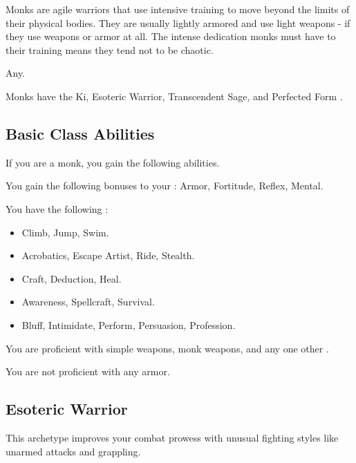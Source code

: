     Monks are agile warriors that use intensive training to move beyond the limits of their physical bodies.
    They are usually lightly armored and use light weapons - if they use weapons or armor at all.
    The intense dedication monks must have to their training means they tend not to be chaotic.

     Any.

     Monks have the Ki, Esoteric Warrior, Transcendent Sage, and Perfected Form .

    \subsection{Basic Class Abilities}
        If you are a monk, you gain the following abilities.

        You gain the following bonuses to your :  Armor,  Fortitude,  Reflex,  Mental.

        You have the following :
        \begin{itemize}
            \item {} Climb, Jump, Swim.
            \item {} Acrobatics, Escape Artist, Ride, Stealth.
            \item {} Craft, Deduction, Heal.
            \item {} Awareness, Spellcraft, Survival.
            \item {} Bluff, Intimidate, Perform, Persuasion, Profession.
        \end{itemize}

        You are proficient with simple weapons, monk weapons, and any one other .

        You are not proficient with any armor.

    \subsection{Esoteric Warrior}\label{Esoteric Warrior}
        This archetype improves your combat prowess with unusual fighting styles like unarmed attacks and grappling.

